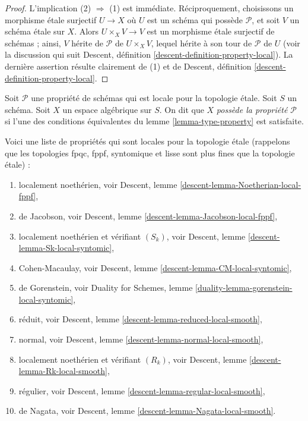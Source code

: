 \begin{proof}
L'implication (2) $\Rightarrow$ (1) est immédiate.
Réciproquement, choisissons un morphisme \'etale surjectif $U \to X$
où $U$ est un schéma qui possède $\mathcal{P}$, et soit $V$ un schéma \'etale sur
$X$. Alors $U \times_X V \rightarrow V$ est un morphisme \'etale surjectif
de schémas ; ainsi, $V$ hérite de $\mathcal{P}$ de $U \times_X V$, lequel
hérite à son tour de $\mathcal{P}$ de $U$ (voir la discussion qui suit
Descent, définition \ref{descent-definition-property-local}).
La dernière assertion résulte clairement de (1) et de
Descent, définition \ref{descent-definition-property-local}.
\end{proof}

\begin{definition}
\label{definition-type-property}
Soit $\mathcal{P}$ une propriété de schémas qui est
locale pour la topologie \'etale.
Soit $S$ un schéma.
Soit $X$ un espace algébrique sur $S$.
On dit que $X$ {\it possède la propriété $\mathcal{P}$}
si l'une des conditions équivalentes du
lemme \ref{lemma-type-property}
est satisfaite.
\end{definition}

\begin{remark}
\label{remark-list-properties-local-etale-topology}
Voici une liste de propriétés qui sont locales pour la topologie \'etale
(rappelons que les topologies fpqc, fppf, syntomique et lisse sont
plus fines que la topologie \'etale) :
\begin{enumerate}
\item localement noethérien, voir
Descent, lemme \ref{descent-lemma-Noetherian-local-fppf},
\item de Jacobson, voir
Descent, lemme \ref{descent-lemma-Jacobson-local-fppf},
\item localement noethérien et vérifiant $(S_k)$, voir
Descent, lemme \ref{descent-lemma-Sk-local-syntomic},
\item Cohen-Macaulay, voir
Descent, lemme \ref{descent-lemma-CM-local-syntomic},
\item de Gorenstein, voir
Duality for Schemes, lemme \ref{duality-lemma-gorenstein-local-syntomic},
\item réduit, voir
Descent, lemme \ref{descent-lemma-reduced-local-smooth},
\item normal, voir
Descent, lemme \ref{descent-lemma-normal-local-smooth},
\item localement noethérien et vérifiant $(R_k)$, voir
Descent, lemme \ref{descent-lemma-Rk-local-smooth},
\item régulier, voir
Descent, lemme \ref{descent-lemma-regular-local-smooth},
\item de Nagata, voir
Descent, lemme \ref{descent-lemma-Nagata-local-smooth}.
\end{enumerate}
\end{remark}

